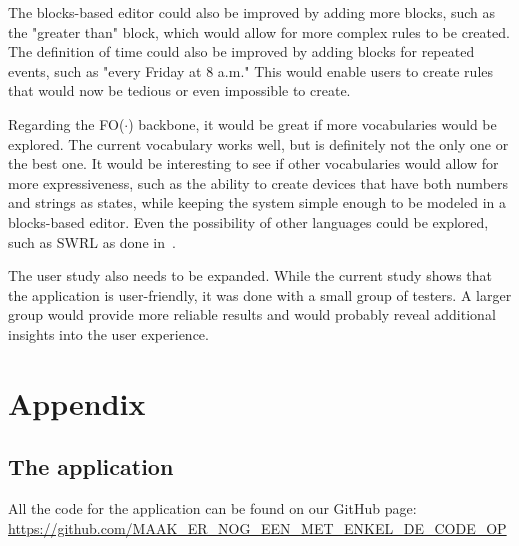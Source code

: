 \documentclass[11pt,a4paper]{report}
\newcommand{\fodot}{FO($\cdot$)\xspace}
\begin{document}
\begin{idplisting}
The blocks-based editor could also be improved by adding more blocks, such as the "greater than" block, which would allow for more complex rules to be created. The definition of time could also be improved by adding blocks for repeated events, such as "every Friday at 8 a.m." This would enable users to create rules that would now be tedious or even impossible to create.

Regarding the \fodot backbone, it would be great if more vocabularies would be explored. The current vocabulary works well, but is definitely not the only one or the best one. It would be interesting to see if other vocabularies would allow for more expressiveness, such as the ability to create devices that have both numbers and strings as states, while keeping the system simple enough to be modeled in a blocks-based editor. Even the possibility of other languages could be explored, such as SWRL as done in~\cite{SOTA_OntologyBased}.

The user study also needs to be expanded. While the current study shows that the application is user-friendly, it was done with a small group of testers. A larger group would provide more reliable results and would probably reveal additional insights into the user experience.

\printbibliography

\appendix
\chapter{Appendix}
\section{The application}
\label{appendix:application}
All the code for the application can be found on our GitHub page: \url{https://github.com/MAAK_ER_NOG_EEN_MET_ENKEL_DE_CODE_OP}


\end{idplisting}
\end{document}
